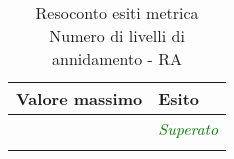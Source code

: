\begin{longtable}{|>{\centering\arraybackslash}p{4cm}|>{\centering\arraybackslash}p{3cm}|}
	\hline
	\rowcolor{Gray}
	\textbf{Valore massimo} & \textbf{Esito} \\
	\hline
	
	6 & \textcolor{Green}{\textit{Superato}}\\
	\hline
	
	\caption{Resoconto esiti metrica Numero di livelli di annidamento - RA}
\end{longtable}
